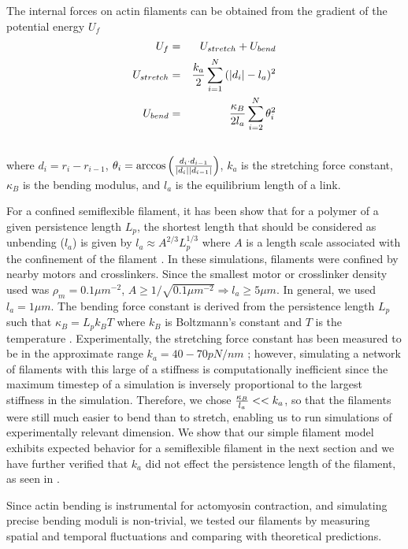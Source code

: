 \documentclass[12pt]{article}
\begin{document}
The internal forces on actin filaments can be obtained from the gradient of the potential energy $U_f$
\begin{eqnarray}
  U_f &=& U_{stretch} + U_{bend}\\
  U_{stretch}&=&{k_a\over2}\sum_{i=1}^{N}{(|d_i| - l_a)^2}\\\nonumber
  U_{bend}&=&{\kappa_B\over 2l_a}\sum_{i=2}^N{\theta_i^2}\\\nonumber
  \label{eqn:Ufil}
\end{eqnarray}
where $d_i = r_i-r_{i-1}$, $\theta_i = \arccos{\left({d_i\cdot d_{i-1}\over |d_i||d_{i-1}|}\right)}$, $k_a$ is the
stretching force constant, $\kappa_B$ is the bending modulus, and $l_a$ is the equilibrium length of a
link. 
\par
For a confined semiflexible filament, it has been show that for a polymer of a given persistence length $L_p$, the shortest length that should be considered as unbending ($l_a$) is given by $l_a\approx A^{2/3}L_p^{1/3}$ where $A$ is a length scale associated with the confinement of the
filament \cite{odijk1983}. In these simulations, filaments were confined by nearby motors and crosslinkers. Since the smallest motor or crosslinker density used was $\rho_m=0.1\mu m^{-2}$, $A\ge1/\sqrt{0.1\mu m^{-2}}\Rightarrow l_a\ge5\mu m$. In general, we used $l_a=1\mu m$.
The bending force constant is derived from the persistence length $L_p$ such that
$\kappa_B = L_p k_B T$ where $k_B$ is Boltzmann's constant and $T$ is the temperature \cite{rubinstein}. Experimentally,
the stretching force constant has been measured to be in the approximate range $k_a=40-70pN/nm$ \cite{kojima1994, higuchi1995}; however, simulating a
network of filaments with this large of a stiffness is computationally inefficient since the maximum timestep of a simulation is inversely proportional to the largest stiffness in the simulation. Therefore, we chose ${\kappa_B\over l_a} <<k_a$, so that the filaments were still much easier to bend than to stretch, enabling us to run simulations of experimentally relevant dimension. We show that our simple filament model exhibits expected behavior for a semiflexible filament in the next section and we have further verified that $k_a$ did not effect the persistence length of the filament, as seen in . 
\par
Since actin bending is instrumental for actomyosin contraction, and simulating precise bending moduli is non-trivial, we tested our filaments by measuring spatial and temporal fluctuations and comparing with theoretical predictions.
\end{document}
